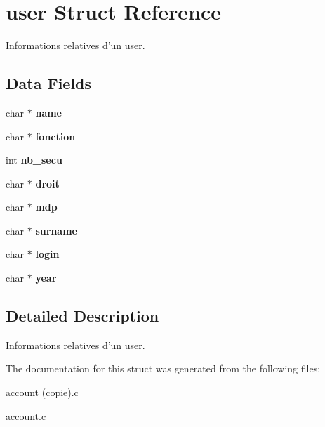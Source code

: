 \hypertarget{structuser}{\section{user Struct Reference}
\label{structuser}
}


Informations relatives d'un user.  


\subsection*{Data Fields}
\begin{DoxyCompactItemize}
\item 
\hypertarget{structuser_ad547fb8186b526cb1b588daad4334fbe}{char $\ast$ {\bfseries name}}\label{structuser_ad547fb8186b526cb1b588daad4334fbe}

\item 
\hypertarget{structuser_a03032dfb522faf8fc8b586f8ca409f12}{char $\ast$ {\bfseries fonction}}\label{structuser_a03032dfb522faf8fc8b586f8ca409f12}

\item 
\hypertarget{structuser_ac6027e0f55070f652792b4766a04d3d8}{int {\bfseries nb\+\_\+secu}}\label{structuser_ac6027e0f55070f652792b4766a04d3d8}

\item 
\hypertarget{structuser_a6f2fa22546269212472c26fa6a399bc8}{char $\ast$ {\bfseries droit}}\label{structuser_a6f2fa22546269212472c26fa6a399bc8}

\item 
\hypertarget{structuser_aa2dfdee8d5f63a5682c02175c8f685a8}{char $\ast$ {\bfseries mdp}}\label{structuser_aa2dfdee8d5f63a5682c02175c8f685a8}

\item 
\hypertarget{structuser_ae8df3d96ed0866e7d455c8dc90108897}{char $\ast$ {\bfseries surname}}\label{structuser_ae8df3d96ed0866e7d455c8dc90108897}

\item 
\hypertarget{structuser_abc99aa2957ed9b8ef43bcbec1dc6e11f}{char $\ast$ {\bfseries login}}\label{structuser_abc99aa2957ed9b8ef43bcbec1dc6e11f}

\item 
\hypertarget{structuser_a77e655058227bdece998528fa4aee14a}{char $\ast$ {\bfseries year}}\label{structuser_a77e655058227bdece998528fa4aee14a}

\end{DoxyCompactItemize}


\subsection{Detailed Description}
Informations relatives d'un user. 

The documentation for this struct was generated from the following files\+:\begin{DoxyCompactItemize}
\item 
account (copie).\+c\item 
\hyperlink{account_8c}{account.\+c}\end{DoxyCompactItemize}
